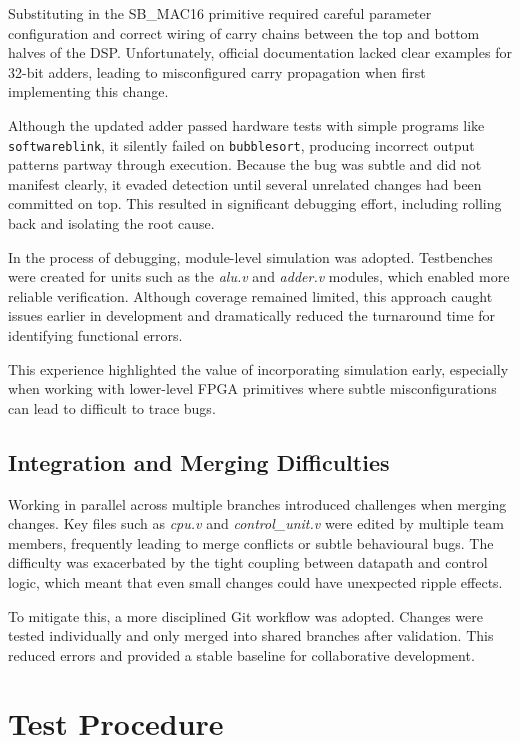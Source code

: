 \documentclass[a4paper,10pt]{article}
\begin{document}
Substituting in the SB\_MAC16 primitive required careful parameter configuration 
and correct wiring of carry chains between the top and bottom halves of the DSP. 
Unfortunately, official documentation lacked clear examples for 32-bit adders, 
leading to misconfigured carry propagation when first implementing this change.

Although the updated adder passed hardware tests with simple programs like 
\texttt{softwareblink}, it silently failed on \texttt{bubblesort}, 
producing incorrect output patterns partway through execution. 
Because the bug was subtle and did not manifest clearly, 
it evaded detection until several unrelated changes had been committed on top. 
This resulted in significant debugging effort, including rolling back 
and isolating the root cause.

In the process of debugging, module-level simulation was adopted. 
Testbenches were created for units such as the 
\textit{alu.v} and \textit{adder.v} modules, 
which enabled more reliable verification. 
Although coverage remained limited, this approach caught issues 
earlier in development and dramatically reduced the turnaround time 
for identifying functional errors.

This experience highlighted the value of incorporating simulation early, 
especially when working with lower-level FPGA primitives where 
subtle misconfigurations can lead to difficult to trace bugs.

\subsection*{Integration and Merging Difficulties}
Working in parallel across multiple branches 
introduced challenges when merging changes. 
Key files such as \textit{cpu.v} and \textit{control\_unit.v} 
were edited by multiple team members, 
frequently leading to merge conflicts or subtle behavioural bugs. 
The difficulty was exacerbated by the tight coupling 
between datapath and control logic, 
which meant that even small changes could have unexpected ripple effects.

To mitigate this, a more disciplined Git workflow was adopted. 
Changes were tested individually and only merged 
into shared branches after validation. 
This reduced errors and provided a stable baseline 
for collaborative development.

\section{Test Procedure}
\label{sec:Test_Procedure}
\end{document}
